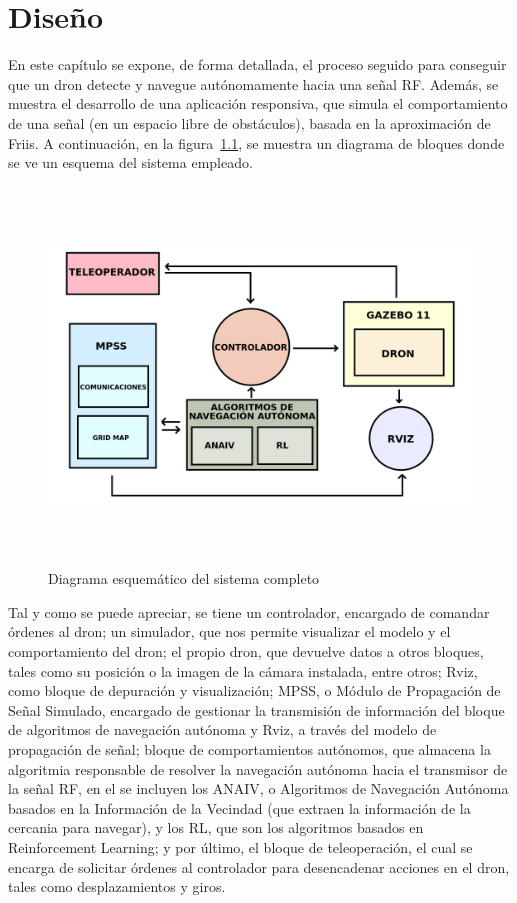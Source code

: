 \chapter{Diseño}
\label{cap:capitulo4}

En este capítulo se expone, de forma detallada, el proceso seguido para conseguir que un dron detecte y navegue autónomamente hacia una señal \ac{RF}. Además, se muestra el desarrollo de una aplicación responsiva, que simula el comportamiento de una señal (en un espacio libre de obstáculos), basada en la aproximación de Friis. A continuación, en la figura~\ref{fig:diagrama}, se muestra un diagrama de bloques donde se ve un esquema del sistema empleado.\\

\begin{figure} [tp]
	\begin{center}
	\includegraphics[height=10cm]{imagenes/cap4/0_diagrama_general.png}
	\end{center}
	\caption[Diagrama esquemático del sistema completo]{Diagrama esquemático del sistema completo}
	\label{fig:diagrama}
\end{figure}

Tal y como se puede apreciar, se tiene un controlador, encargado de comandar órdenes al dron; un simulador, que nos permite visualizar el modelo y el comportamiento del dron; el propio dron, que devuelve datos a otros bloques, tales como su posición o la imagen de la cámara instalada, entre otros; Rviz, como bloque de depuración y visualización; \ac{MPSS}, o Módulo de Propagación de Señal Simulado, encargado de gestionar la transmisión de información del bloque de algoritmos de navegación autónoma y Rviz, a través del modelo de propagación de señal; bloque de comportamientos autónomos, que almacena la algoritmia responsable de resolver la navegación autónoma hacia el transmisor de la señal \ac{RF}, en el se incluyen los \ac{ANAIV}, o Algoritmos de Navegación Autónoma basados en la Información de la Vecindad (que extraen la información de la cercania para navegar), y los \ac{RL}, que son los algoritmos basados en Reinforcement Learning; y por último, el bloque de teleoperación, el cual se encarga de solicitar órdenes al controlador para desencadenar acciones en el dron, tales como desplazamientos y giros.


